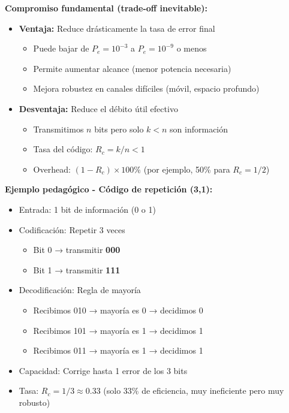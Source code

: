 \documentclass[10pt,a4paper]{article}
\begin{document}
\textbf{Compromiso fundamental (trade-off inevitable):}
\begin{itemize}
\item \textbf{Ventaja:} Reduce drásticamente la tasa de error final
  \begin{itemize}
  \item Puede bajar de $P_e = 10^{-3}$ a $P_e = 10^{-9}$ o menos
  \item Permite aumentar alcance (menor potencia necesaria)
  \item Mejora robustez en canales difíciles (móvil, espacio profundo)
  \end{itemize}
\item \textbf{Desventaja:} Reduce el débito útil efectivo
  \begin{itemize}
  \item Transmitimos $n$ bits pero solo $k < n$ son información
  \item Tasa del código: $R_c = k/n < 1$
  \item Overhead: $(1 - R_c) \times 100\%$ (por ejemplo, 50\% para $R_c=1/2$)
  \end{itemize}
\end{itemize}

\textbf{Ejemplo pedagógico - Código de repetición (3,1):}
\begin{itemize}
\item Entrada: 1 bit de información (0 o 1)
\item Codificación: Repetir 3 veces
  \begin{itemize}
  \item Bit 0 → transmitir \textbf{000}
  \item Bit 1 → transmitir \textbf{111}
  \end{itemize}
\item Decodificación: Regla de mayoría
  \begin{itemize}
  \item Recibimos 010 → mayoría es 0 → decidimos 0
  \item Recibimos 101 → mayoría es 1 → decidimos 1
  \item Recibimos 011 → mayoría es 1 → decidimos 1
  \end{itemize}
\item Capacidad: Corrige hasta 1 error de los 3 bits
\item Tasa: $R_c = 1/3 \approx 0.33$ (solo 33\% de eficiencia, muy ineficiente pero muy robusto)
\end{itemize}
\end{document}
